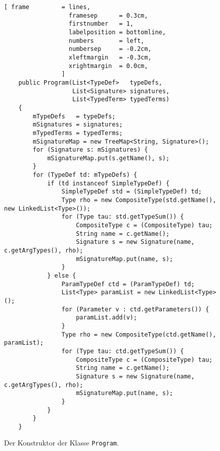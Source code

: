 \begin{figure}[!ht]
\centering
\begin{Verbatim}[ frame         = lines, 
                  framesep      = 0.3cm, 
                  firstnumber   = 1,
                  labelposition = bottomline,
                  numbers       = left,
                  numbersep     = -0.2cm,
                  xleftmargin   = -0.3cm,
                  xrightmargin  = 0.0cm,
                ]
    public Program(List<TypeDef>   typeDefs, 
                   List<Signature> signatures, 
                   List<TypedTerm> typedTerms) 
    {
        mTypeDefs   = typeDefs;
        mSignatures = signatures;
        mTypedTerms = typedTerms;
        mSignatureMap = new TreeMap<String, Signature>();
        for (Signature s: mSignatures) {
            mSignatureMap.put(s.getName(), s);
        }
        for (TypeDef td: mTypeDefs) {
            if (td instanceof SimpleTypeDef) {
                SimpleTypeDef std = (SimpleTypeDef) td;
                Type rho = new CompositeType(std.getName(), new LinkedList<Type>());
                for (Type tau: std.getTypeSum()) {
                    CompositeType c = (CompositeType) tau;
                    String name = c.getName();
                    Signature s = new Signature(name, c.getArgTypes(), rho);
                    mSignatureMap.put(name, s);
                }
            } else {
                ParamTypeDef ctd = (ParamTypeDef) td;
                List<Type> paramList = new LinkedList<Type>();
                for (Parameter v : ctd.getParameters()) {
                    paramList.add(v);
                }
                Type rho = new CompositeType(ctd.getName(), paramList);
                for (Type tau: ctd.getTypeSum()) {
                    CompositeType c = (CompositeType) tau;
                    String name = c.getName();
                    Signature s = new Signature(name, c.getArgTypes(), rho);
                    mSignatureMap.put(name, s);
                }
            }
        }
    }
\end{Verbatim}
\vspace*{-0.3cm}
\caption{Der Konstruktor der Klasse \texttt{Program}.}
\label{fig:Program.Program.java}
\end{figure}
\vspace*{0.3cm}


